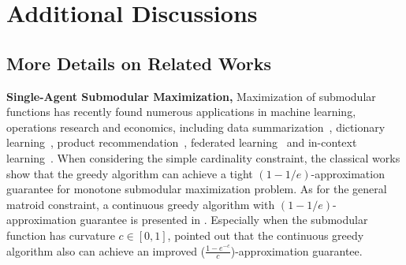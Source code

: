 \appendix
\section{Additional Discussions} 
\subsection{More Details on Related Works}\label{Appendix:related_work}
\textbf{Single-Agent Submodular Maximization,} Maximization of submodular functions has recently found numerous applications in machine learning, operations research and economics, including data summarization~\citep{lin2010multi,lin2011class,wei2013using,wei2015submodularity}, dictionary learning~\citep{das2018approximate}, product recommendation~\citep{kempe2003maximizing,el2009turning,mirzasoleiman2016fast,wang2022empirical}, federated learning~\citep{balakrishnan2022diverse,FedSub,zhao2024a,zhao2024huber} and in-context learning~\citep{kumari2024end,fancombatting,jin2024learning,jin2024visual,jin2024apeer}. When considering the simple cardinality constraint, the classical works\citep{fisher1978analysis,nemhauser1978analysis} show that the
greedy algorithm can achieve a tight $(1-1/e)$-approximation guarantee for monotone submodular maximization problem. As for the general matroid constraint, a continuous greedy algorithm with $(1-1/e)$-approximation guarantee is presented in \citep{calinescu2011maximizing,chekuri2014submodular}. Especially when the submodular function has curvature $c\in[0,1]$, \citet{vondrak2010submodularity} pointed out that the continuous greedy algorithm also can achieve an improved ($\frac{1-e^{-c}}{c}$)-approximation guarantee.

